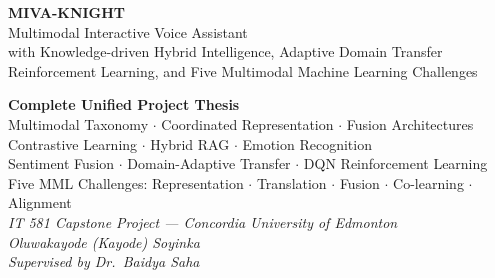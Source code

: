 \documentclass[12pt,a4paper]{article}
\theoremstyle{definition}
\theoremstyle{plain}
\theoremstyle{remark}
\begin{document}
\begin{titlepage}

\vspace*{2.5cm}
{\color{white}\fontsize{32}{38}\selectfont\bfseries\hspace{1.2cm}MIVA-KNIGHT}\\[0.4cm]
{\color{white!85}\fontsize{18}{22}\selectfont\hspace{1.2cm}Multimodal Interactive Voice Assistant}\\[0.15cm]
{\color{white!75}\fontsize{13}{17}\selectfont\hspace{1.2cm}with Knowledge-driven Hybrid Intelligence, Adaptive Domain Transfer}\\
{\color{white!75}\fontsize{13}{17}\selectfont\hspace{1.2cm}Reinforcement Learning, and Five Multimodal Machine Learning Challenges}

\vspace{1.2cm}
\begin{center}
\begin{tcolorbox}[width=0.92\textwidth,colback=white,colframe=NavyBlue,arc=6pt,boxrule=1.5pt]
\centering
\textbf{Complete Unified Project Thesis}\\[6pt]
Multimodal Taxonomy $\cdot$ Coordinated Representation $\cdot$ Fusion Architectures\\
Contrastive Learning $\cdot$ Hybrid RAG $\cdot$ Emotion Recognition\\
Sentiment Fusion $\cdot$ Domain-Adaptive Transfer $\cdot$ DQN Reinforcement Learning\\
Five MML Challenges: Representation $\cdot$ Translation $\cdot$ Fusion $\cdot$ Co-learning $\cdot$ Alignment\\[8pt]
\small\textit{IT 581 Capstone Project --- Concordia University of Edmonton}\\
\textit{Oluwakayode (Kayode) Soyinka}\\[4pt]
\textit{Supervised by Dr.\ Baidya Saha}
\end{tcolorbox}
\end{center}


\end{titlepage}
\end{document}
